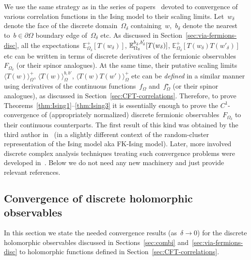 \documentclass[reqno,11pt,a4paper]{amsart}
\theoremstyle{remark}
\newcommand{\dob}{{b,b'}}
\newcommand{\Edelta}{\mathbb{E}_{\Omega_\delta}}
\newcommand{\f}{f_{\Omega}}
\newcommand{\fstar}{f_{\Omega}^\star}
\newcommand\Corr[1]{\langle #1 \rangle}
\newcommand\CorrO[2][+]{\Corr{#2}_\Omega^{#1}}
\begin{document}
We use the same strategy as in the series of papers~\cite{HonSmi13,Hon10,CheIzy13,CheHonIzy15} devoted to convergence of various correlation functions in the Ising model to their scaling limits. Let~$w_\delta$ denote the face of the discrete domain~$\Omega_\delta$ containing~$w$,~$b_\delta$ denote the nearest to~$b\in\partial\Omega$ boundary edge of~$\Omega_\delta$ etc. As discussed in Section~\ref{sec:via-fermions-disc}, all the expectations~$\Edelta^+[T(w_\delta)]$, $\Edelta^{b_\delta^{\vphantom{\prime}},b'_\delta}[T(w_\delta)]$, $\Edelta^+[T(w_\delta)T(w'_\delta)]$ etc can be written in terms of discrete derivatives of the fermionic observables~$F_{\Omega_\delta}$ (or their spinor analogues). At the same time, their putative scaling limits~$\CorrO{T(w)}$, $\Corr{T(w)}_\Omega^{\dob}$, $\CorrO{T(w)T(w')}$ etc can be \emph{defined} in a similar manner using derivatives of the continuous functions~$\f$ and~$\fstar$ (or their spinor analogues), as discussed in Section~\ref{sec:CFT-correlations}. Therefore, to prove Theorems~\mbox{\ref{thm:Ising1}--\ref{thm:Ising3}} it is essentially enough to prove the $C^1$-convergence of (appropriately normalized) discrete fermionic observables~$F_{\Omega_\delta}$ to their continuous counterparts. The first result of this kind was obtained by the third author in~\cite{Smi10} (in a slightly different context of the random-cluster representation of the Ising model aka FK-Ising model). Later, more involved discrete complex analysis techniques treating such convergence problems were developed in~\cite{CheSmi11,CheSmi12,HonSmi13,Hon10,CheIzy13,CheHonIzy15,CheHonIzy21}. 
Below we do not need any new machinery and just provide relevant references.

\subsection{Convergence of discrete holomorphic observables} \label{sub:convergence-fermions}
In this section we state the needed convergence results (as~$\delta\to 0$) for the discrete holomorphic observables discussed in Sections~\ref{sec:combi} and~\ref{sec:via-fermions-disc} to holomorphic functions defined in Section~\ref{sec:CFT-correlations}.
\end{document}
